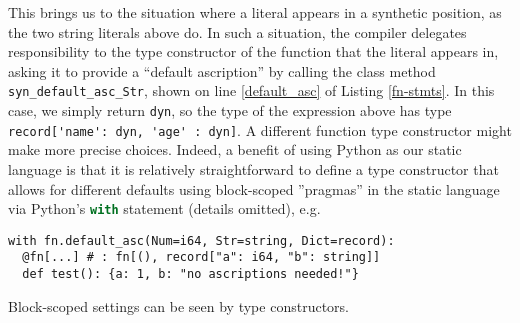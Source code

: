 \documentclass[9pt]{sigplanconf}
\newcommand{\lstinlinep}[1]{\lstinline[language=Python,basicstyle=\ttfamily\small,deletendkeywords={tuple,buffer,map}]{#1}}
\begin{document}
This brings us to the situation where a literal appears in a synthetic position, as the two string literals above do. In such a situation, the compiler delegates responsibility to the type constructor of the function that the literal appears in, asking it to provide a ``default ascription'' by calling the class method \lstinlinep{syn_default_asc_Str}, shown on line \ref{default_asc} of Listing \ref{fn-stmts}. In this case, we simply return \lstinlinep{dyn}, so the type of the expression above has type \lstinline[basicstyle=\ttfamily\small]{record['name': dyn, 'age' : dyn]}. A different function type constructor might make more precise choices. Indeed, a benefit of using Python as our static language is that it is relatively straightforward to define a type constructor that allows for different defaults using block-scoped ''pragmas'' in the static language via Python's \lstinlinep{with} statement \cite{python} (details omitted), e.g. 
\begin{codelisting}[h]
\begin{lstlisting}[numbers=none]
with fn.default_asc(Num=i64, Str=string, Dict=record):
  @fn[...] # : fn[(), record["a": i64, "b": string]]
  def test(): {a: 1, b: "no ascriptions needed!"} 
\end{lstlisting}
\caption{Block-scoped settings can be seen by type constructors.}
\label{defaultasc}
\end{codelisting}
\vspace{-10px}

\end{document}
